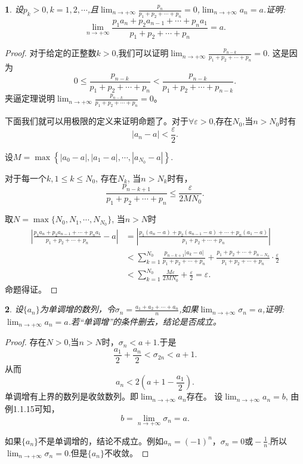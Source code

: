 \documentclass[utf8]{book}
\newtheorem{example}{}[section]             %
\begin{document}
\begin{example}
设$p_k>0, k=1,2,\cdots$,且$\displaystyle\lim_{n\to +\infty}\frac{p_n}{p_1+p_2+\cdots+p_n}=0$,$\displaystyle\lim_{n\to +\infty}a_n=a$.证明:
$$\displaystyle\lim_{n\to +\infty}\frac{p_1a_n+p_2a_{n-1}+\cdots+p_na_1}{p_1+p_2+\cdots+p_n}=a.$$
\end{example}
\begin{proof}
对于给定的正整数$k>0$,我们可以证明$\displaystyle\lim_{n\to +\infty}\frac{p_{n-k}}{p_1+p_2+\cdots+p_n}=0$.
这是因为
$$0\leq \frac{p_{n-k}}{p_1+p_2+\cdots+p_n} < \frac{p_{n-k}}{p_1+p_2+\cdots+p_{n-k}}.$$
夹逼定理说明$\displaystyle\lim_{n\to +\infty}\frac{p_{n-k}}{p_1+p_2+\cdots+p_n}=0$。

下面我们就可以用极限的定义来证明命题了。对于$\forall \varepsilon > 0$,存在$N_0$,当$n>N_0$时有$$\left|a_n-a\right| < \frac{\varepsilon}{2}.$$

设$M = \max\left\{\left|a_0 -a\right|, \left|a_1 -a\right|, \cdots, \left|a_{N_0} -a\right|\right\}$.

对于每一个$k, 1\leq k \leq N_0$, 存在$N_k$, 当$n>N_k$时有，
$$\frac{p_{n-k+1}}{p_1+p_2+\cdots+p_n} \leq \frac{\varepsilon}{2MN_0}.$$

取$N=\max\{N_0, N_1, \cdots, N_{N_0}\}$, 当$n>N$时
\begin{equation*}
\begin{split}
\left|\frac{p_1a_n+p_2a_{n-1}+\cdots+p_na_1}{p_1+p_2+\cdots+p_n} - a\right| &= \left|\frac{p_1(a_n-a)+p_2(a_{n-1}-a)+\cdots+p_n(a_1-a)}{p_1+p_2+\cdots+p_n}\right|\\
&<\sum_{k=1}^{N_0} \frac{p_{n-k+1}|a_k - a|}{p_1+p_2+\cdots+p_n} + \frac{p_1 + p_2 + \cdots + p_{n-N_0}}{p_1+p_2+\cdots+p_n}\cdot\frac{\varepsilon}{2} \\
&<\sum_{k=1}^{N_0}\frac{M\varepsilon}{2MN_0} + \frac{\varepsilon}{2} = \varepsilon.
\end{split}
\end{equation*}
命题得证。
\end{proof}
\begin{example}
设$\{a_n\}$为单调增的数列，令$\sigma_n=\displaystyle\frac{a_1+a_2+\cdots+a_n}{n}$,如果$\displaystyle\lim_{n\to +\infty}\sigma_n = a$,证明:$\displaystyle\lim_{n\to +\infty}a_n = a$.若“单调增”的条件删去，结论是否成立。
\end{example}
\begin{proof}
存在$N > 0$,当$n>N$时，$\sigma_n < a+1$.于是
$$\frac{a_1}{2}+\frac{a_n}{2} < \sigma_{2n} < a + 1.$$从而$$a_n < 2\left(a+1-\frac{a_1}{2}\right).$$
单调增有上界的数列是收敛数列。即$\displaystyle\lim_{n\to +\infty}a_n$存在。
设$\displaystyle\lim_{n\to +\infty}a_n=b$, 由例1.1.15可知，
$$b=\displaystyle\lim_{n\to +\infty}\sigma_n = a.$$

如果$\{a_n\}$不是单调增的，结论不成立。例如$a_n=(-1)^n$，$\sigma_n = 0 \text{或} -\frac{1}{n}$.所以$\displaystyle\lim_{n\to +\infty}\sigma_n = 0$.但是$\{a_n\}$不收敛。
\end{proof}
\end{document}
